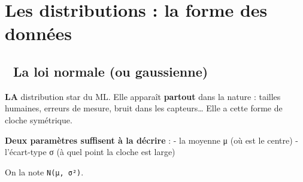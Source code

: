 \documentclass[
  french,
  11pt,
  a4paper,
]{scrbook}
\begin{document}
\begin{tcolorbox}
\end{tcolorbox}

\chapter{Les distributions : la forme des
données}\label{les-distributions-la-forme-des-donnuxe9es}

\section{🔔 La loi normale (ou
gaussienne)}\label{la-loi-normale-ou-gaussienne}

\textbf{LA} distribution star du ML. Elle apparaît \textbf{partout} dans
la nature : tailles humaines, erreurs de mesure, bruit dans les
capteurs\ldots{} Elle a cette forme de cloche symétrique.

\textbf{Deux paramètres suffisent à la décrire} : - la moyenne μ (où est
le centre) - l'écart-type σ (à quel point la cloche est large)

On la note \texttt{N(μ,\ σ²)}.
\end{document}
